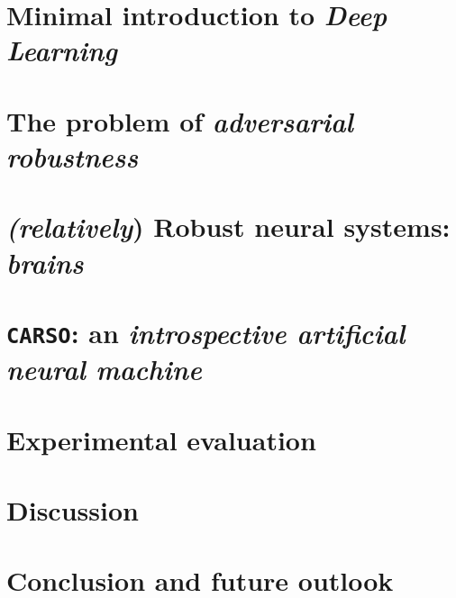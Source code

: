 
\section{Minimal introduction to \textit{Deep Learning}}{
}

\section{The problem of \textit{adversarial robustness}}{
}

\section{\textit{(relatively}) Robust neural systems: \textit{brains}}{
}

\section{\texttt{CARSO}: an \textit{introspective artificial neural machine}}{
}

\section{Experimental evaluation}{
}

\section{Discussion}{
}

\section{Conclusion and future outlook}{
}